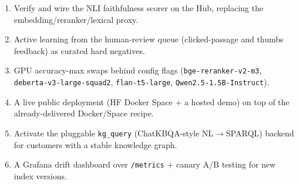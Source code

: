 \documentclass[12pt,a4paper]{article}
\begin{document}
\begin{enumerate}\setlength\itemsep{0.15em}
  \item Verify and wire the NLI faithfulness scorer on the Hub, replacing the embedding/reranker/lexical proxy.
  \item Active learning from the human-review queue (clicked-passage and thumbs feedback) as curated hard negatives.
  \item GPU accuracy-max swaps behind config flags (\texttt{bge-reranker-v2-m3}, \texttt{deberta-v3-large-squad2}, \texttt{flan-t5-large}, \texttt{Qwen2.5-1.5B-Instruct}).
  \item A live public deployment (HF Docker Space $+$ a hosted demo) on top of the already-delivered Docker/Space recipe.
  \item Activate the pluggable \texttt{kg\_query} (ChatKBQA-style NL$\rightarrow$SPARQL) backend for customers with a stable knowledge graph.
  \item A Grafana drift dashboard over \texttt{/metrics} $+$ canary A/B testing for new index versions.
\end{enumerate}
\end{document}
